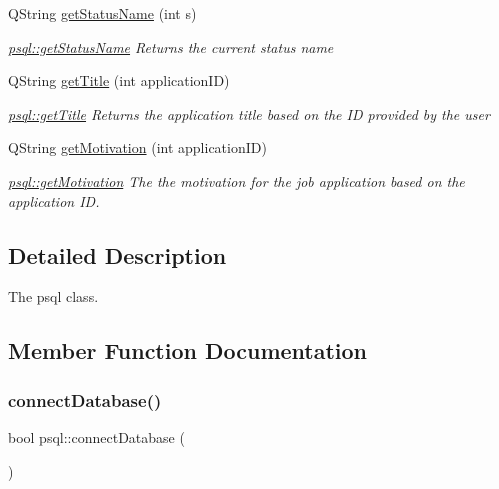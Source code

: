 \begin{DoxyCompactItemize}
Q\+String \hyperlink{classpsql_a5c2a64419a68a258071fd1f9a37c7c09}{get\+Status\+Name} (int s)
\begin{DoxyCompactList}\small\item\em \hyperlink{classpsql_a5c2a64419a68a258071fd1f9a37c7c09}{psql\+::get\+Status\+Name} Returns the current status name \end{DoxyCompactList}\item 
Q\+String \hyperlink{classpsql_ada9e3be3e0866011edf53e30ec510afc}{get\+Title} (int application\+ID)
\begin{DoxyCompactList}\small\item\em \hyperlink{classpsql_ada9e3be3e0866011edf53e30ec510afc}{psql\+::get\+Title} Returns the application title based on the ID provided by the user \end{DoxyCompactList}\item 
Q\+String \hyperlink{classpsql_aca1b2273937491e113089c1547caf49b}{get\+Motivation} (int application\+ID)
\begin{DoxyCompactList}\small\item\em \hyperlink{classpsql_aca1b2273937491e113089c1547caf49b}{psql\+::get\+Motivation} The the motivation for the job application based on the application ID. \end{DoxyCompactList}\end{DoxyCompactItemize}


\subsection{Detailed Description}
The psql class. 

\subsection{Member Function Documentation}
\mbox{\label{classpsql_ada485c933df77453629e3821ab19fa4c}} 
\subsubsection{\texorpdfstring{connect\+Database()}{connectDatabase()}}
{\footnotesize\ttfamily bool psql\+::connect\+Database (\begin{DoxyParamCaption}{ }\end{DoxyParamCaption})}



